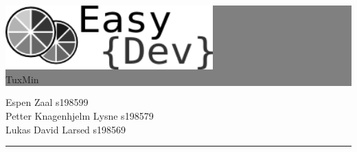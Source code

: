 \setlength{\oddsidemargin}{0mm} %
\setlength{\evensidemargin}{0mm} %

\newcommand{\HRule}[1]{\hfill \rule{0.2\linewidth}{#1}} %



\thispagestyle{empty} %


\colorbox{grey}{
	\parbox[t]{1.0\linewidth}{
		\centering \fontsize{50pt}{80pt}\selectfont %
		\vspace*{0.7cm} %
		
		\hfill \includegraphics[width=80mm]{./img/fremside/logo.png} \\
		\hfill 
		\fontsize{30pt}{50pt}\selectfont 
		{\selectfont 
		TuxMin%
		}
		\par
		
		\vspace*{0.7cm} %
	}
}


\vfill %


{\centering \large 
\hfill Espen Zaal s198599 \\
\hfill Petter Knagenhjelm Lysne s198579 \\
\hfill Lukas David Larsed s198569 \\


\HRule{1pt}} %


\clearpage %